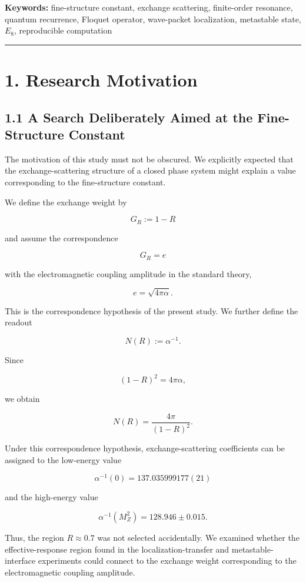 \documentclass[
  10pt,
  a4paper,
]{article}
\begin{document}
\textbf{Keywords:} fine-structure constant, exchange scattering,
finite-order resonance, quantum recurrence, Floquet operator,
wave-packet localization, metastable state, \(E_8\), reproducible
computation

\begin{center}\rule{0.5\linewidth}{0.5pt}\end{center}

\section{1. Research Motivation}\label{research-motivation}

\subsection{1.1 A Search Deliberately Aimed at the Fine-Structure
Constant}\label{a-search-deliberately-aimed-at-the-fine-structure-constant}

The motivation of this study must not be obscured. We explicitly
expected that the exchange-scattering structure of a closed phase system
might explain a value corresponding to the fine-structure constant.

We define the exchange weight by

\[
G_R:=1-R
\]

and assume the correspondence

\[
G_R=e
\]

with the electromagnetic coupling amplitude in the standard theory,

\[
e=\sqrt{4\pi\alpha}.
\]

This is the correspondence hypothesis of the present study. We further
define the readout

\[
N(R):=\alpha^{-1}.
\]

Since

\[
(1-R)^2=4\pi\alpha,
\]

we obtain

\[
\boxed{
N(R)=\frac{4\pi}{(1-R)^2}
}.
\]

Under this correspondence hypothesis, exchange-scattering coefficients
can be assigned to the low-energy value

\[
\alpha^{-1}(0)=137.035999177(21)
\]

and the high-energy value

\[
\alpha^{-1}(M_Z^2)=128.946\pm0.015.
\]

Thus, the region \(R\approx0.7\) was not selected accidentally. We
examined whether the effective-response region found in the
localization-transfer and metastable-interface experiments could connect
to the exchange weight corresponding to the electromagnetic coupling
amplitude.
\end{document}

